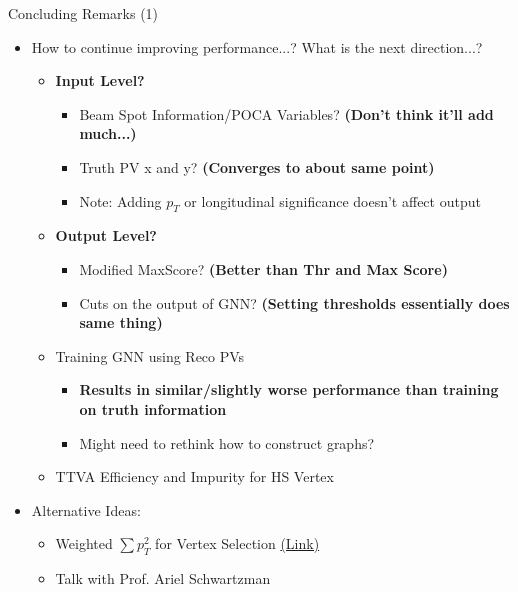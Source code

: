 \documentclass[xcolor=table,aspectratio=169]{beamer}
\begin{document}
\begin{frame}{Concluding Remarks (1)}
    \begin{itemize}
        \item How to continue improving performance...? What is the next direction...?
        \begin{itemize}
            \item \textbf{Input Level?}
            \begin{itemize}
                \item Beam Spot Information/POCA Variables? \textbf{(Don't think it'll add much...)}
                \item Truth PV x and y? \textbf{(Converges to about same point)}
                \item Note: Adding \(p_T\) or longitudinal significance doesn't affect output
            \end{itemize}
            \item \textbf{Output Level?}
            \begin{itemize}
                \item Modified MaxScore? \textbf{(Better than Thr and Max Score)}
                \item Cuts on the output of GNN? \textbf{(Setting thresholds essentially does same thing)}
            \end{itemize}
            \item Training GNN using Reco PVs
            \begin{itemize}
                \item \textbf{Results in similar/slightly worse performance than training on truth information}
                \item Might need to rethink how to construct graphs?
            \end{itemize}
            \item TTVA Efficiency and Impurity for HS Vertex
        \end{itemize}
        \item Alternative Ideas:
        \begin{itemize}
            \item Weighted \(\sum p_T^2\) for Vertex Selection \href{https://arxiv.org/abs/1910.07681}{(Link)}
            \item Talk with Prof. Ariel Schwartzman
        \end{itemize}
    \end{itemize}
\end{frame}
\end{document}
